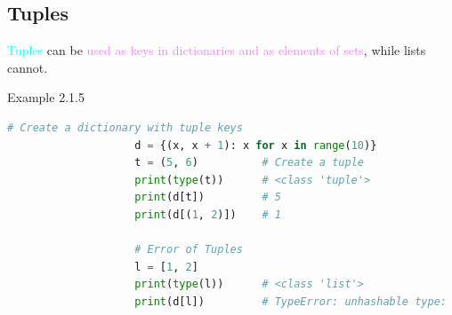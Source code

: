 \documentclass{book}
\begin{document}
    \subsection{Tuples}
    \textcolor{cyan}{Tuples} can be \textcolor{violet}{used as keys in dictionaries and as elements of sets}, while lists cannot.
    \begin{egBox}[]{Example 2.1.5}{}
    \begin{lstlisting}[language=Python, basicstyle=\ttfamily\small, keywordstyle=\color{blue}, commentstyle=\color{forestgreen}, stringstyle=\color{red}, showstringspaces=false]
                    # Create a dictionary with tuple keys
                    d = {(x, x + 1): x for x in range(10)}
                    t = (5, 6)          # Create a tuple
                    print(type(t))      # <class 'tuple'>
                    print(d[t])         # 5
                    print(d[(1, 2)])    # 1
                    
                    # Error of Tuples
                    l = [1, 2]
                    print(type(l))      # <class 'list'>
                    print(d[l])         # TypeError: unhashable type: 'list'
    \end{lstlisting}
    \end{egBox}
    \newpage
\end{document}
